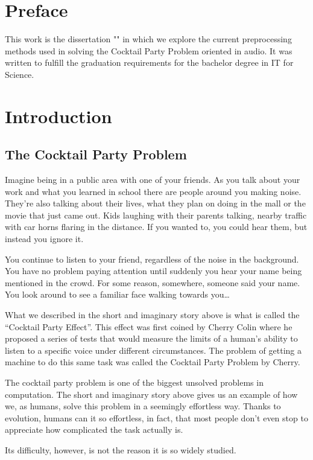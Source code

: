 \documentclass{book}
\begin{document}
\chapter*{Preface}
\qquad This work is the dissertation "\titlename" in which we explore the current preprocessing methods used in solving the Cocktail Party Problem oriented in audio.
It was written to fulfill the graduation requirements for the bachelor degree in IT for Science.
\chapter{Introduction}
\section{The Cocktail Party Problem}
\qquad Imagine being in a public area with one of your friends.
As you talk about your work and what you learned in school there are people around you making noise.
They’re also talking about their lives, what they plan on doing in the mall or the movie that just came out.
Kids laughing with their parents talking, nearby traffic with car horns flaring in the distance.
If you wanted to, you could hear them, but instead you ignore it.
\par
You continue to listen to your friend, regardless of the noise in the background.
You have no problem paying attention until suddenly you hear your name being mentioned in the crowd.
For some reason, somewhere, someone said your name.
You look around to see a familiar face walking towards you…
\par
What we described in the short and imaginary story above is what is called the “Cocktail Party Effect”.
This effect was first coined by Cherry Colin\cite{Cherry} where he proposed a series of tests that would measure the limits of a human’s ability to listen to a specific voice under different circumstances.
The problem of getting a machine to do this same task was called the Cocktail Party Problem by Cherry.
\par
The cocktail party problem is one of the biggest unsolved problems in computation.
The short and imaginary story above gives us an example of how we, as humans, solve this problem in a seemingly effortless way.
Thanks to evolution, humans can it so effortless, in fact, that most people don’t even stop to appreciate how complicated the task actually is.
\par
Its difficulty, however, is not the reason it is so widely studied.
\end{document}
